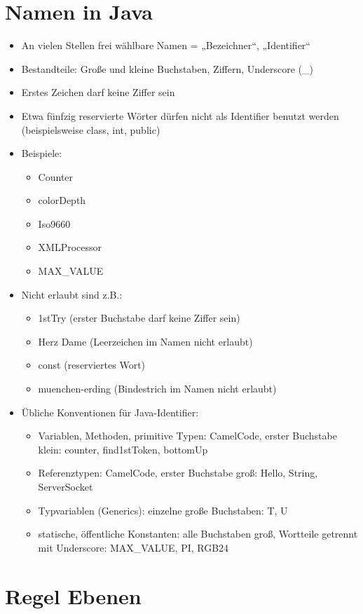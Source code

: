  \section{Namen in Java}
 \begin{itemize}
 \item An vielen Stellen frei wählbare Namen = „Bezeichner“, „Identifier“
 \item Bestandteile: Große und kleine Buchstaben, Ziffern, Underscore (\_)
 \item Erstes Zeichen darf keine Ziffer sein
 \item Etwa fünfzig reservierte Wörter dürfen nicht als Identifier benutzt werden (beispielsweise class, int, public)
	 \item Beispiele:
 	\begin{itemize}
		\item Counter
		\item colorDepth
		\item Iso9660
		\item XMLProcessor
		\item MAX\_VALUE
	\end{itemize}
	\item Nicht erlaubt sind z.B.:
	\begin{itemize}
		\item1stTry 	(erster Buchstabe darf keine Ziffer sein)
		\item Herz Dame (Leerzeichen im Namen nicht erlaubt)
		\item const (reserviertes Wort)
		\item muenchen-erding (Bindestrich im Namen nicht erlaubt)
	\end{itemize}
	\item Übliche Konventionen für Java-Identifier:
	\begin{itemize}
		\item Variablen, Methoden, primitive Typen: CamelCode, erster Buchstabe klein: counter, find1stToken, bottomUp
 		\item Referenztypen: CamelCode, erster Buchstabe groß: Hello, String, ServerSocket
		\item Typvariablen (Generics): einzelne große Buchstaben: T, U
		\item statische, öffentliche Konstanten: alle Buchstaben groß, Wortteile getrennt mit Underscore: MAX\_VALUE, PI, RGB24
	\end{itemize}
\end{itemize}
%
%
%
\section{Regel Ebenen}
